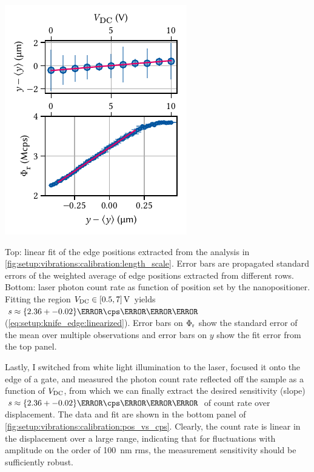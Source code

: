 \begin{marginfigure}[*-7]
    \centering
    \includegraphics{img/pdf/setup/knife_edge_fits}
    \caption[]{
        Top: linear fit of the edge positions extracted from the analysis in \cref{fig:setup:vibrations:calibration:length_scale}.
        Error bars are propagated standard errors of the weighted average of edge positions extracted from different rows.
        Bottom: laser photon count rate as function of position set by the nanopositioner.
        Fitting the region $V_{\mr{DC}}\in[0.5, 7]\,\unit{\volt}$ yields $s\approx\qty{2.36+-0.02}{\mega\cps\per\micro\meter}$ (\cf \cref{eq:setup:knife_edge:linearized}).
        Error bars on $\Phi_{\mathrm{r}}$ show the standard error of the mean over multiple observations and error bars on $y$ show the fit error from the top panel.
    }
    \label{fig:setup:vibrations:calibration:pos_vs_cps}
\end{marginfigure}

Lastly, I switched from white light illumination to the laser, focused it onto the edge of a gate, and measured the photon count rate reflected off the sample as a function of $V_{\mathrm{DC}}$, from which we can finally extract the desired sensitivity (slope) $s\approx\qty{2.36+-0.02}{\mega\cps\per\micro\meter}$ of count rate over displacement.
The data and fit are shown in the bottom panel of \cref{fig:setup:vibrations:calibration:pos_vs_cps}.
Clearly, the count rate is linear in the displacement over a large range, indicating that for fluctuations with amplitude on the order of \qty{100}{\nano\meter} \gls{rms}, the measurement sensitivity should be sufficiently robust.


